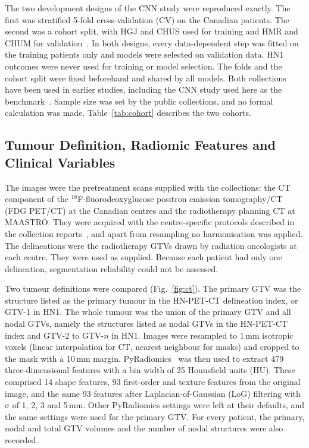 \documentclass[pdflatex,iicol,sn-nature]{sn-jnl}
\begin{document}
The two development designs of the CNN study were reproduced exactly. The first was stratified 5-fold cross-validation (CV) on the Canadian patients. The second was a cohort split, with HGJ and CHUS used for training and HMR and CHUM for validation~\cite{diamant2019,mateus2023}. In both designs, every data-dependent step was fitted on the training patients only and models were selected on validation data. HN1 outcomes were never used for training or model selection. The folds and the cohort split were fixed beforehand and shared by all models. Both collections have been used in earlier studies, including the CNN study used here as the benchmark~\cite{vallieres2017,diamant2019,mateus2023,kazmierski2023}. Sample size was set by the public collections, and no formal calculation was made. Table~\ref{tab:cohort} describes the two cohorts.



\subsection{Tumour Definition, Radiomic Features and Clinical Variables}\label{sec:features}
The images were the pretreatment scans supplied with the collections: the CT component of the $^{18}$F-fluorodeoxyglucose positron emission tomography/CT (FDG PET/CT) at the Canadian centres and the radiotherapy planning CT at MAASTRO. They were acquired with the centre-specific protocols described in the collection reports~\cite{vallieres2017,aerts2014}, and apart from resampling no harmonisation was applied. The delineations were the radiotherapy GTVs drawn by radiation oncologists at each centre. They were used as supplied. Because each patient had only one delineation, segmentation reliability could not be assessed.

Two tumour definitions were compared (Fig.~\ref{fig:ct}). The primary GTV was the structure listed as the primary tumour in the HN-PET-CT delineation index, or GTV-1 in HN1. The whole tumour was the union of the primary GTV and all nodal GTVs, namely the structures listed as nodal GTVs in the HN-PET-CT index and GTV-2 to GTV-$n$ in HN1. Images were resampled to 1\,mm isotropic voxels (linear interpolation for CT, nearest neighbour for masks) and cropped to the mask with a 10\,mm margin. PyRadiomics~\cite{vangriethuysen2017} was then used to extract 479 three-dimensional features with a bin width of 25 Hounsfield units (HU). These comprised 14 shape features, 93 first-order and texture features from the original image, and the same 93 features after Laplacian-of-Gaussian (LoG) filtering with $\sigma$ of 1, 2, 3 and 5\,mm. Other PyRadiomics settings were left at their defaults, and the same settings were used for the primary GTV. For every patient, the primary, nodal and total GTV volumes and the number of nodal structures were also recorded.
\end{document}
